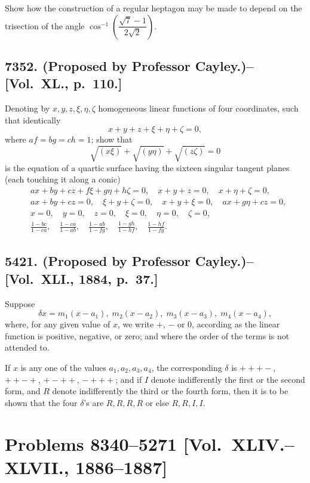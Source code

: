 \documentclass[11pt,a4paper]{article}
\theoremstyle{definition}
\begin{document}
Show how the construction of a regular heptagon may be made to depend on the trisection of the angle $\cos^{-1}\left(\dfrac{\sqrt{7}-1}{2\sqrt{2}}\right)$.

\subsection*{7352. (Proposed by Professor Cayley.)\---[Vol.~XL., p.~110.]}

Denoting by $x,y,z,\xi,\eta,\zeta$ homogeneous linear functions of four coordinates, such that identically
\[
x+y+z+\xi+\eta+\zeta = 0,
\]
where $af=bg=ch=1$; show that
\[
\sqrt{(x\xi)} + \sqrt{(y\eta)} + \sqrt{(z\zeta)} = 0
\]
is the equation of a quartic surface having the sixteen singular tangent planes (each touching it along a conic)
\[
\begin{aligned}
&ax+by+cz+f\xi+g\eta+h\zeta=0, \quad x+y+z=0, \quad x+\eta+\zeta=0, \\
&ax+by+cz=0, \quad \xi+y+\zeta=0, \quad x+y+\xi=0, \quad ax+g\eta+cz=0, \\
&x=0, \quad y=0, \quad z=0, \quad \xi=0, \quad \eta=0, \quad \zeta=0, \\
&\frac{1-bc}{1-ca}, \quad \frac{1-ca}{1-ab}, \quad \frac{1-ab}{1-fg}, \quad \frac{1-gh}{1-hf}, \quad \frac{1-hf}{1-fg}.
\end{aligned}
\]

\subsection*{5421. (Proposed by Professor Cayley.)\---[Vol.~XLI., 1884, p.~37.]}

Suppose
\[
\delta x = m_1(x-a_1), \; m_2(x-a_2), \; m_3(x-a_3), \; m_4(x-a_4),
\]
where, for any given value of $x$, we write $+$, $-$ or $0$, according as the linear function is positive, negative, or zero; and where the order of the terms is not attended to.

If $x$ is any one of the values $a_1, a_2, a_3, a_4$, the corresponding $\delta$ is $+++-$, $++-+$, $+-++$, $-+++$; and if $I$ denote indifferently the first or the second form, and $R$ denote indifferently the third or the fourth form, then it is to be shown that the four $\delta$'s are $R,R,R,R$ or else $R,R,I,I$.

\newpage

\section*{Problems 8340--5271 [Vol.~XLIV.--XLVII., 1886--1887]}
\end{document}
